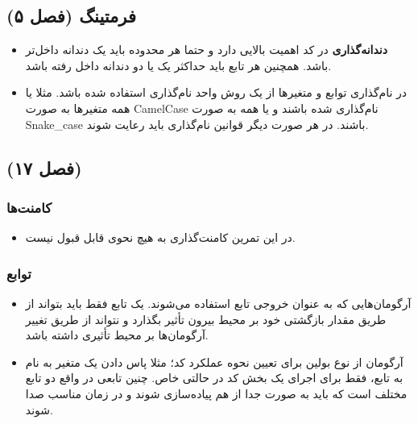 \documentclass{utap}
\begin{document}
\subsection{فرمتینگ (فصل ۵)}
  \begin{itemize}
        \item 
\textbf{دندانه‌گذاری}
در کد اهمیت بالایی دارد و حتما هر محدوده باید یک دندانه داخل‌تر باشد. همچنین هر تابع باید حداکثر یک یا دو دندانه داخل رفته باشد.
	\item
در نام‌گذاری توابع و متغیر‌ها از یک روش واحد نام‌گذاری استفاده شده باشد. مثلا یا همه متغیر‌ها به صورت CamelCase نام‌گذاری شده باشند و یا همه به صورت Snake\_case باشند. در هر صورت دیگر قوانین نام‌گذاری باید رعایت شوند.
    \end{itemize}


\subsection{ (فصل ۱۷)}

	\subsubsection{کامنت‌ها}
	  \begin{itemize}
	        \item در این تمرین کامنت‌گذاری به هیچ نحوی قابل قبول نیست.
	    \end{itemize}


	\subsubsection{توابع}
	  \begin{itemize}
	        \item آرگومان‌هایی که به عنوان خروجی تابع استفاده می‌شوند. یک تابع فقط باید بتواند از طریق مقدار بازگشتی خود بر محیط بیرون تأثیر بگذارد و نتواند از طریق تغییر آرگومان‌ها بر محیط تأثیری داشته باشد.
		\item آرگومان از نوع بولین برای تعیین نحوه عملکرد کد؛
مثلا پاس دادن یک متغیر به نام  به تابع، فقط برای اجرای یک بخش کد در حالتی خاص. چنین تابعی در واقع دو تابع مختلف است که باید به صورت جدا از هم پیاده‌سازی شوند و در زمان مناسب صدا شوند.
	    \end{itemize}
\end{document}

